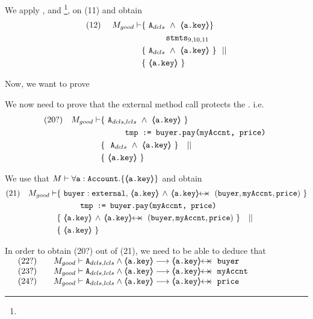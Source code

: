\begin{proofO}
We apply  {},  and {}\footnote{}, on (11) and obtain 
\begin{align*}
\text{(12)}  \ \ \ \ M_{good} \vdash 
		&	\{  \ \Aparams\  \wedge\ {\inside{\prg{a.key}}}  \} \\
		& \SPT \stmtsP\ \\  
		& \{ \ \Aparams\ \wedge \  {\inside{\prg{a.key}}} \ \} \ \ || \\
		& \{ \ {\inside{\prg{a.key}}}\  \}
\end{align*}


Now, we want to prove 

We now need to prove that the external method call  protects the . i.e.
\begin{align*}
\text{(20?)} \ \ \ M_{good} \vdash & \{ \ \Alocals \   \wedge\    {\inside{\prg{a.key}}}\  \} \\
		  		& \SPT  \prg{tmp := buyer.pay(myAccnt, price)}\ \\  
		  		& \{ \ \ \Aparams \ \wedge\ {\inside{\prg{a.key}}} \ \} \ \ \  || \ \ \  \\
		  		&   \{ \   {\inside{\prg{a.key}}}\  \}
\end{align*}
\normalsize

We use that $M \vdash \forall {\mbox{\normalfont{\texttt{a}}}:\mbox{\normalfont{\texttt{Account}}}}.{{\{}}{\langle\!\!\langle \mbox{\normalfont{\texttt{a.key}}} \rangle\!\!\rangle}{{\}}}$
 and  obtain
 \\
 \small
\begin{align*}
\text{(21)} \ \ \ M_{good} \vdash & \{ \ \prg{buyer}:\prg{external},\,  {\inside{\prg{a.key}}} \, \wedge\, 
\protectedFrom {\prg{a.key}} {(\prg{buyer},\prg{myAccnt},\prg{price})} \  \} \\
		  		& \SPT  \prg{tmp := buyer.pay(myAccnt, price)}\ \\  
		  		& \{ \ \inside{\prg{a.key}} \, \wedge\, 
\protectedFrom {\prg{a.key}} {(\prg{buyer},\prg{myAccnt},\prg{price})}\ \} \ \ \  || \ \ \  \\
		  		&   \{ \   {\inside{\prg{a.key}}}\  \}
\end{align*}
\normalsize 
 
In order to obtain (20?) out of (21), we need to be able to deduce that\\
$
\begin{array}{llll}
& (22?) & & M_{good} \vdash \Alocals \wedge  {\inside{\prg{a.key}}}  \longrightarrow \protectedFrom {\prg{a.key}} {\prg{buyer}} 
\\
& (23?) & & M_{good} \vdash \Alocals \wedge  {\inside{\prg{a.key}}}  \longrightarrow \protectedFrom {\prg{a.key}} {\prg{myAccnt}} 
\\
& (24?) & & M_{good} \vdash \Alocals \wedge  {\inside{\prg{a.key}}}  \longrightarrow \protectedFrom {\prg{a.key}} {\prg{price}} 
\end{array}
$


\end{proofO}
